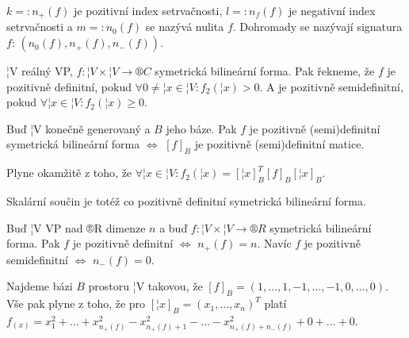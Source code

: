 \documentclass[12pt]{article}                   %
\begin{document}
        \begin{poznamka}
            $k =: n_+(f)$ je pozitivní index setrvačnosti, $l =: n_f(f)$ je negativní index setrvačnosti a $m =: n_0(f)$ se nazývá nulita $f$. Dohromady se nazývají signatura $f$: $(n_0(f), n_+(f), n_-(f))$.
        \end{poznamka}

        \begin{definice}
                ¦V reálný VP, $f: ¦V \times ¦V \rightarrow ®C$ symetrická bilineární forma. Pak řekneme, že $f$ je pozitivně definitní, pokud $\forall 0 ≠ ¦x \in ¦V: f_2(¦x) > 0$. A je pozitivně semidefinitní, pokud $\forall ¦x \in ¦V: f_2(¦x) ≥ 0$.
        \end{definice}

        \begin{pozorovani}
            Buď ¦V konečně generovaný a $B$ jeho báze. Pak $f$ je pozitivně (semi)definitní symetrická bilineární forma $\Leftrightarrow$ $[f]_B$ je pozitivně (semi)definitní matice.

            \begin{dukazin}
                Plyne okamžitě z toho, že $\forall ¦x \in ¦V: f_2(¦x) = [¦x]_B^T[f]_B[¦x]_B$.
            \end{dukazin}
        \end{pozorovani}

        \begin{poznamka}
            Skalární součin je totéž co pozitivně definitní symetrická bilineární forma.
        \end{poznamka}

        \begin{tvrzeni}
            Buď ¦V VP nad ®R dimenze $n$ a buď $f: ¦V \times ¦V \rightarrow ®R$ symetrická bilineární forma. Pak $f$ je pozitivně definitní $\Leftrightarrow$ $n_+(f) = n$. Navíc $f$ je pozitivně semidefinitní $\Leftrightarrow$ $n_-(f) = 0$.

            \begin{dukazin}
                Najdeme bázi $B$ prostoru ¦V takovou, že $[f]_B = (1, …, 1, -1, …, -1, 0, …, 0)$. Vše pak plyne z toho, že pro $[¦x]_B = (x_1, …, x_n)^T$ platí $f_(x) = x_1^2 + … + x_{n_+(f)}^2 - x_{n_+(f) + 1}^2 - … - x_{n_+(f) + n_-(f)}^2 + 0 + … + 0$.
            \end{dukazin}
        \end{tvrzeni}
\end{document}
